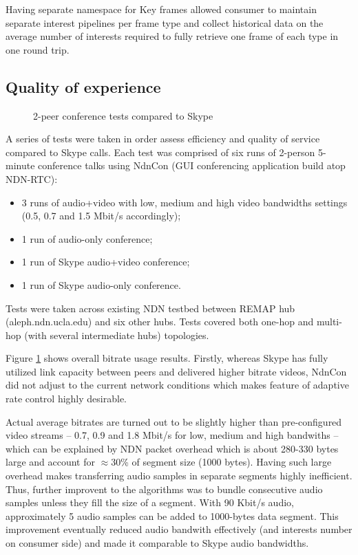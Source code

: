 \documentclass{icn/sig-alternate-2012} %
\newcommand{\ndnrtcName}{NDN-RTC} %
\begin{document}
Having separate namespace for Key frames allowed consumer to maintain separate interest pipelines per frame type and collect historical data on the average number of interests required to fully retrieve one frame of each type in one round trip.

\subsection{Quality of experience}
\begin{figure}[t!]
\centering
\begin{tiny}
\def\svgwidth{0.5\textwidth}
\end{tiny}
\vspace{-18pt}
\caption{2-peer conference tests compared to Skype}
\label{fig:tests-skype}
\end{figure}

A series of tests were taken in order assess efficiency and quality of service compared to Skype calls. Each test was comprised of six runs of 2-person 5-minute conference talks using NdnCon (GUI conferencing application build atop \ndnrtcName{}):
\begin{itemize}
\item 3 runs of audio+video with low, medium and high video bandwidths settings (0.5, 0.7 and 1.5 Mbit/s accordingly);
\item 1 run of audio-only conference;
\item 1 run of Skype audio+video conference;
\item 1 run of Skype audio-only conference.
\end{itemize}

Tests were taken across existing NDN testbed between REMAP hub (aleph.ndn.ucla.edu) and six other hubs. Tests covered both one-hop and multi-hop (with several intermediate hubs) topologies.

Figure \ref{fig:tests-skype} shows overall bitrate usage results. Firstly, whereas Skype has fully utilized link capacity between peers and delivered higher bitrate videos, NdnCon did not adjust to the current network conditions which makes feature of adaptive rate control highly desirable.

Actual average bitrates are turned out to be slightly higher than pre-configured video streams -- 0.7, 0.9 and 1.8 Mbit/s for low, medium and high bandwiths -- which can be explained by NDN packet overhead which is about 280-330 bytes large and account for $\approx$30\% of segment size (1000 bytes). Having such large overhead makes transferring audio samples in separate segments highly inefficient. Thus, further improvent to the algorithms was to bundle consecutive audio samples unless they fill the size of a segment. With 90 Kbit/s audio, approximately 5 audio samples can be added to 1000-bytes data segment. This improvement eventually reduced audio bandwith effectively (and interests number on consumer side) and made it comparable to Skype audio bandwidths.
\end{document}
